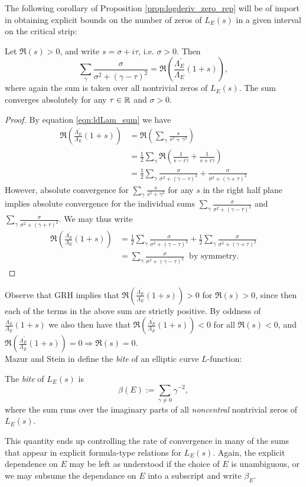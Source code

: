 \documentclass[10pt]{article}
\newcommand{\pr}{^{\prime}}
\newcommand{\Les}{L_E(s)}
\newcommand{\ldLam}[1]{\frac{\Lambda_E\pr}{\Lambda_E}\left(#1\right)}
\begin{document}
The following corollary of Proposition \ref{prop:logderiv_zero_rep} will be of import in obtaining explicit bounds on the number of zeros of $L_E(s)$ in a given interval on the critical strip:
\begin{corollary}\label{cor:Re_logderiv}
Let $\Re(s) > 0$, and write $s = \sigma + i\tau$, i.e. $\sigma > 0$. Then
\begin{equation}
\sum_{\gamma} \frac{\sigma}{\sigma^2+(\gamma-\tau)^2} = \Re\left(\ldLam{1+s}\right),
\end{equation}
where again the sum is taken over all nontrivial zeros of $L_E(s)$. The sum converges absolutely for any $\tau \in \mathbb{R}$ and $\sigma > 0$.
\end{corollary}
\begin{proof}
By equation \ref{eqn:ldLam_sum} we have
\begin{align*}
\Re\left(\ldLam{1+s}\right) &= \Re\left(\sum_{\gamma} \frac{s}{s^2+\gamma^2}\right) \\
& = \frac{1}{2} \sum_{\gamma} \Re\left(\frac{1}{s - i \gamma} + \frac{1}{s + i \gamma}\right) \\
&= \frac{1}{2} \sum_{\gamma} \frac{\sigma}{\sigma^2+(\gamma-\tau)^2} +  \frac{\sigma}{\sigma^2+(\gamma+\tau)^2}
\end{align*}
However, absolute convergence for $\sum_{\gamma} \frac{s}{s^2+\gamma^2}$ for any $s$ in the right half plane implies absolute convergence for the individual sums $\sum_{\gamma} \frac{\sigma}{\sigma^2+(\gamma-\tau)^2}$ and $\sum_{\gamma} \frac{\sigma}{\sigma^2+(\gamma+\tau)^2}$. We may thus write
\begin{align*}
\Re\left(\ldLam{1+s}\right) &= \frac{1}{2} \sum_{\gamma} \frac{\sigma}{\sigma^2+(\gamma-\tau)^2} +  \frac{1}{2} \sum_{\gamma}\frac{\sigma}{\sigma^2+(\gamma+\tau)^2} \\
&= \sum_{\gamma} \frac{\sigma}{\sigma^2+(\gamma-\tau)^2} \;\;\text{by symmetry.}
\end{align*}
\end{proof}
Observe that GRH implies that $\Re(\ldLam{1+s})>0$ for $\Re(s)>0$, since then each of the terms in the above sum are strictly positive. By oddness of $\ldLam{1+s}$ we also then have that $\Re(\ldLam{1+s})<0$ for all $\Re(s)<0$, and $\Re(\ldLam{1+s})=0 \Rightarrow \Re(s)=0$. \\

Mazur and Stein in \cite{MaSt-2013} define the {\it bite} of an elliptic curve $L$-function:
\begin{definition}
The {\it bite} of $\Les$ is
\begin{equation}
\beta(E) := \sum_{\gamma \ne 0} \gamma^{-2},
\end{equation}
where the sum runs over the imaginary parts of all {\it noncentral} nontrivial zeros of $\Les$.
\end{definition}
This quantity ends up controlling the rate of convergence in many of the sums that appear in explicit formula-type relations for $\Les$. Again, the explicit dependence on $E$ may be left as understood if the choice of $E$ is unambiguous, or we may subsume the dependance on $E$ into a subscript and write $\beta_E$. \\
\end{document}
